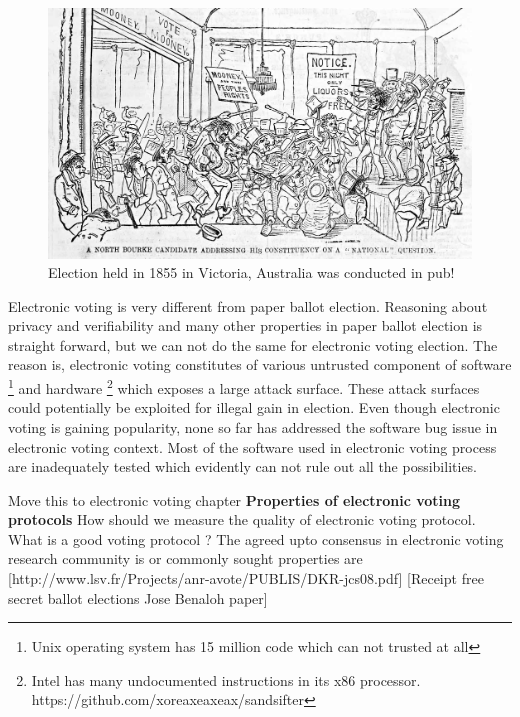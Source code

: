  
 \begin{figure}[htb]
	\begin{center}
	\includegraphics[scale=0.25]{NorthBourke.jpg}
	\caption{Election held in 1855 in Victoria, Australia 
	  was conducted in pub!}
	\end{center}
  \end{figure}   
  
 Electronic voting is very different from paper ballot election. 
 Reasoning 
 about privacy and verifiability and many other properties 
 in paper ballot election 
 is straight forward, but we can not do the same for 
 electronic voting election. The reason is, electronic voting constitutes 
 of various untrusted component of software
 \footnote{Unix operating system has 15 million code which can not 
 trusted at all} and hardware
 \footnote{Intel has many undocumented instructions in its x86 
 processor. https://github.com/xoreaxeaxeax/sandsifter} which 
 exposes a large attack surface. These attack surfaces could 
 potentially be exploited for illegal gain in election. 
 Even though electronic voting is gaining popularity, none so far has 
 addressed the software bug issue in electronic voting context. 
 Most of the software used in electronic voting process are 
 inadequately tested which evidently can not rule out all 
 the possibilities.

Move this to electronic voting chapter
 \textbf{Properties of electronic voting protocols}
  How should we measure the quality of electronic voting protocol. 
  What is a good voting protocol ? 
  The agreed upto consensus in electronic voting research
  community is or commonly sought properties are  
  [http://www.lsv.fr/Projects/anr-avote/PUBLIS/DKR-jcs08.pdf]
  [Receipt free secret ballot elections Jose Benaloh paper]
  

